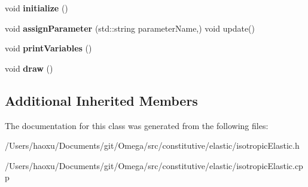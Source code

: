 \begin{DoxyCompactItemize}
void {\bfseries initialize} ()
\item 
\mbox{\label{classisotropic_elastic_ae0dd139f8fa318e03b897a0425fbfb41}} 
void {\bfseries assign\+Parameter} (std\+::string parameter\+Name,) void update()
\item 
\mbox{\label{classisotropic_elastic_aced4646179b73c77af191c6716ea32d0}} 
void {\bfseries print\+Variables} ()
\item 
\mbox{\label{classisotropic_elastic_a719c4f9f33246c00c7ba3c2af5563141}} 
void {\bfseries draw} ()
\end{DoxyCompactItemize}
\subsection*{Additional Inherited Members}


The documentation for this class was generated from the following files\+:\begin{DoxyCompactItemize}
\item 
/\+Users/haoxu/\+Documents/git/\+Omega/src/constitutive/elastic/isotropic\+Elastic.\+h\item 
/\+Users/haoxu/\+Documents/git/\+Omega/src/constitutive/elastic/isotropic\+Elastic.\+cpp\end{DoxyCompactItemize}
